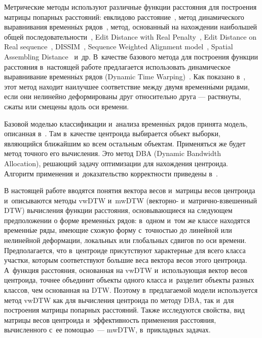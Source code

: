 \begin{multicols}{2}
Метрические методы используют различные функции расстояния для построения 
матрицы попарных расстояний: евклидово расстояние~\cite{Faloutsos1994}, 
метод динамического выравнивания временн$\acute{\mbox{ы}}$х рядов~\cite{Berndt1994,Keogh2005Exact}, 
метод, основанный на нахождении наиболь\-шей общей 
последовательности~\cite{Vlachos2002discovering}, Edit Distance with Real 
Penalty~\cite{Chen2004On}, Edit Distance on Real sequence~\cite{Chen2005Robust}, 
DISSIM~\cite{Frentzos2007Index}, Sequence Weighted Alignment model~\cite{Morse2007An}, 
Spatial Assembling Distance~\cite{Chen2007Spade} и~др. В~качестве базового метода 
для построения функции расстояния в~настоящей работе предлагается использовать 
динамическое выравнивание временн$\acute{\mbox{ы}}$х рядов (Dynamic Time Warping)~\cite{Keogh}. 
Как показано в~\cite{Salvador}, этот метод находит наилучшее соответствие между 
двумя временн$\acute{\mbox{ы}}$ми рядами, если они нелинейно деформированы друг относительно 
друга --- растянуты, сжаты или смещены вдоль оси времени.

Базовой моделью классификации и~анализа временн$\acute{\mbox{ы}}$х рядов принята модель, 
описанная в~\cite{Goncharov}. Там в~качестве центроида выбирается объект выборки, 
являющийся ближайшим ко всем остальным объектам. Применяться же будет метод точного 
его вычисления. Это метод DBA (Dynamic Bandwidth Allocation), 
ре\-ша\-ющий задачу оптимизации для нахождения центроида. 
Алгоритм применения и~доказательство корректности приведены в~\cite{DBA}.

В настоящей работе вводятся понятия вектора весов и~матрицы весов центроида 
и~описываются методы vwDTW и~mwDTW (векторно- и~мат\-рич\-но-взве\-шен\-ный DTW) 
вычисления функции расстояния, основывающиеся на следующем предположении о форме 
временн$\acute{\mbox{ы}}$х рядов: в~одном и~том же классе находятся временн$\acute{\mbox{ы}}$е ряды, имеющие схожую форму 
с~точностью до линейной или нелинейной деформации, локальных или глобальных сдвигов 
по оси времени. Предполагается, что в~центроиде присутствуют характерные для всего 
класса участки, которым соответствуют большие веса вектора весов этого центроида. 
А~функция расстояния, основанная на vwDTW и~использующая вектор весов центроида, 
точнее объединит объекты одного класса и~разделит объекты разных классов, 
чем основанная на DTW. Поэтому в~предлагаемой модели используется метод vwDTW 
как для вычисления центроида по методу DBA, так и~для построения матрицы попарных 
расстояний. Также исследуются свойства, вид матрицы весов центроида и~эффективность 
применения расстояния, вычисленного с~ее помощью~--- mwDTW, в~прикладных задачах.


\end{multicols}
